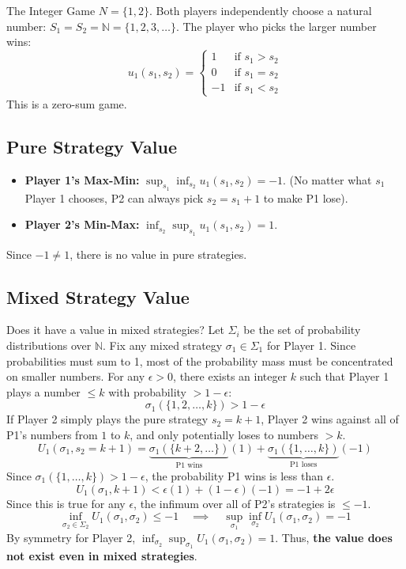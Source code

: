 \documentclass[12pt, a4paper]{article}
\begin{document}
\begin{exbox}{The Integer Game}
  $N = \{1, 2\}$. Both players independently choose a natural number: $S_1 = S_2 = \mathbb{N} = \{1, 2, 3, \dots\}$.
  The player who picks the larger number wins:
  \[
    u_1(s_1, s_2) = 
    \begin{cases} 
      1 & \text{if } s_1 > s_2 \\
      0 & \text{if } s_1 = s_2 \\
      -1 & \text{if } s_1 < s_2
    \end{cases}
  \]
  This is a zero-sum game.
\end{exbox}

\subsection{Pure Strategy Value}
\begin{itemize}
    \item \textbf{Player 1's Max-Min:} $\sup_{s_1} \inf_{s_2} u_1(s_1, s_2) = -1$. (No matter what $s_1$ Player 1 chooses, P2 can always pick $s_2 = s_1 + 1$ to make P1 lose).
    \item \textbf{Player 2's Min-Max:} $\inf_{s_2} \sup_{s_1} u_1(s_1, s_2) = 1$.
\end{itemize}
Since $-1 \neq 1$, there is no value in pure strategies.

\subsection{Mixed Strategy Value}
Does it have a value in mixed strategies? 
Let $\Sigma_i$ be the set of probability distributions over $\mathbb{N}$.
Fix any mixed strategy $\sigma_1 \in \Sigma_1$ for Player 1. Since probabilities must sum to 1, most of the probability mass must be concentrated on smaller numbers. 
For any $\epsilon > 0$, there exists an integer $k$ such that Player 1 plays a number $\leq k$ with probability $> 1-\epsilon$:
\[
  \sigma_1(\{1, 2, \dots, k\}) > 1 - \epsilon
\]
If Player 2 simply plays the pure strategy $s_2 = k+1$, Player 2 wins against all of P1's numbers from $1$ to $k$, and only potentially loses to numbers $> k$.
\[
  U_1(\sigma_1, s_2 = k+1) = \underbrace{\sigma_1(\{k+2, \dots\})}_{\text{P1 wins}} (1) + \underbrace{\sigma_1(\{1, \dots, k\})}_{\text{P1 loses}} (-1)
\]
Since $\sigma_1(\{1, \dots, k\}) > 1-\epsilon$, the probability P1 wins is less than $\epsilon$.
\[
  U_1(\sigma_1, k+1) < \epsilon(1) + (1-\epsilon)(-1) = -1 + 2\epsilon
\]
Since this is true for any $\epsilon$, the infimum over all of P2's strategies is $\leq -1$.
\[
  \inf_{\sigma_2 \in \Sigma_2} U_1(\sigma_1, \sigma_2) \leq -1 \quad \implies \quad \sup_{\sigma_1} \inf_{\sigma_2} U_1(\sigma_1, \sigma_2) = -1
\]
By symmetry for Player 2, $\inf_{\sigma_2} \sup_{\sigma_1} U_1(\sigma_1, \sigma_2) = 1$.
Thus, \textbf{the value does not exist even in mixed strategies}.
\end{document}
